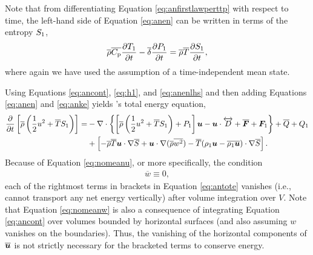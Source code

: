\documentclass[12pt]{article}
\newcommand{\vecf}{\bm{F}}
\begin{document}
 Note that from differentiating Equation \eqref{eq:anfirstlawperttp} with respect to time, the left-hand side of Equation \eqref{eq:anen} can be written in terms of the entropy $S_1$, 
\begin{align}\label{eq:anenlhs}
	\overline{\rho}\overline{C_{\rm{p}}}\frac{\partial T_1}{\partial t} - \overline{\delta}\frac{\partial P_1}{\partial t} = \overline{\rho}\overline{T}\frac{\partial S_1}{\partial t},
\end{align}
where again we have used the assumption of a time-independent mean state. 

Using Equations \eqref{eq:ancont}, \eqref{eq:h1}, and \eqref{eq:anenlhs} and then adding Equations \eqref{eq:anen} and \eqref{eq:anke} yields \citet{Gough1969}'s total energy equation,
\begin{align}\label{eq:antote}
			\pderiv{}{t}\left[\rhoover\left(\frac{1}{2} u^2 + \tmpover \entrone\right)\right] = &-\Div\left\{\left[\rhoover\left(\frac{1}{2} u^2 + \tmpover \entrone\right) + \prsone\right]\vecu- \vecu\cdot\overleftrightarrow{D} + \overline{\vecf} + \vecf_1\right\}+ \heatover + Q_1 \nonumber\\
			 &+\left[-\rhoover\tmpover\ugrad\entrover +\ugrad (\rhoover \overline{w^2})- \tmpover(\rhoone\vecu-\overline{\rhoone\vecu})\cdot\nabla\entrover\right].
\end{align}
Because of Equation \eqref{eq:nomeanu}, or more specifically, the condition
\begin{align}\label{eq:nomeanw}
	\overline{w}\equiv0,
\end{align}
 each of the rightmost terms in brackets in Equation \eqref{eq:antote} vanishes (i.e., cannot transport any net energy vertically) after volume integration over $V$. Note that Equation \eqref{eq:nomeanw} is also a consequence of integrating Equation \eqref{eq:ancont} over volumes bounded by horizontal surfaces (and also assuming $w$ vanishes on the boundaries). Thus, the vanishing of the horizontal components of $\overline{\bm{u}}$ is not strictly necessary for the bracketed terms to conserve energy. 
 
\end{document}
